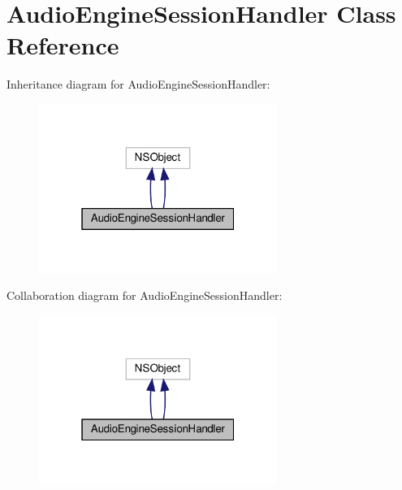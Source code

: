 \hypertarget{interfaceAudioEngineSessionHandler}{}\section{Audio\+Engine\+Session\+Handler Class Reference}
\label{interfaceAudioEngineSessionHandler}


Inheritance diagram for Audio\+Engine\+Session\+Handler\+:
\nopagebreak
\begin{figure}[H]
\begin{center}
\leavevmode
\includegraphics[width=220pt]{interfaceAudioEngineSessionHandler__inherit__graph}
\end{center}
\end{figure}


Collaboration diagram for Audio\+Engine\+Session\+Handler\+:
\nopagebreak
\begin{figure}[H]
\begin{center}
\leavevmode
\includegraphics[width=220pt]{interfaceAudioEngineSessionHandler__coll__graph}
\end{center}
\end{figure}
